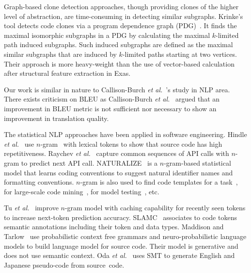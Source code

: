 Graph-based clone detection approaches, though providing clones
of the higher level of abstraction, are time-consuming in detecting
similar subgraphs. Krinke's tool detects code clones via a program
dependence graph (PDG)~\cite{krinke01}. It finds the maximal
isomorphic subgraphs in a PDG by calculating the maximal $k$-limited
path induced subgraphs. Such induced subgraphs are defined as the
maximal similar subgraphs that are induced by $k$-limited paths
starting at two vertices. Their approach is more heavy-weight than the use
of vector-based calculation after structural feature extraction in Exas.




Our work is similar in nature to Callison-Burch {\em et
  al.}~\cite{Callison}'s study in NLP area. There exists criticism on
BLEU as Callison-Burch {\em et al.}~\cite{Callison} argued that an
improvement in BLEU metric is not sufficient nor necessary to show an
improvement in translation quality.


The statistical NLP approaches have been applied in software
engineering. Hindle {\em et al.}~\cite{natural} use
$n$-gram~\cite{manning99} with lexical tokens to show that source code
has high repetitiveness. 
%
Raychev {\em et al.}~\cite{ethz-pldi14} capture common sequences of
API calls with $n$-gram to predict next API call.
NATURALIZE~\cite{barr-codeconvention-fse14} is a $n$-gram-based
statistical model that learns coding conventions to suggest natural
identifier names and formatting conventions.  $n$-gram is also used to
find code templates for a task~\cite{jacob10}, for large-scale
code mining~\cite{sutton-msr13}, for model
testing~\cite{tonella-icse14}, etc.

Tu {\em et al.}~\cite{tu-fse14} improve $n$-gram model with caching
capability for recently seen tokens to increase next-token prediction
accuracy.
%
SLAMC~\cite{fse13} associates to code tokens semantic
annotations including their token and data types.
%
Maddison and Tarlow~\cite{tarlow14} use probabilistic context free
grammars and neuro-probabilistic language models to build language
model for source code. Their model is generative and does not use
semantic context. Oda {\em et al.}~\cite{hide-ase15} uses SMT to
generate English and Japanese pseudo-code from source~code.
